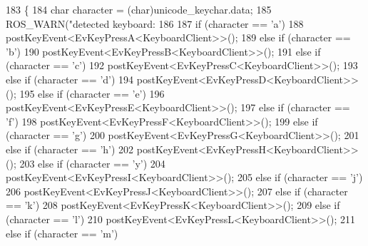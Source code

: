\begin{DoxyCode}
183         \{
184                 \textcolor{keywordtype}{char} character = (char)unicode\_keychar.data;
185                 ROS\_WARN(\textcolor{stringliteral}{"detected keyboard: %
186 
187                 \textcolor{keywordflow}{if} (character == \textcolor{charliteral}{'a'})
188                         postKeyEvent<EvKeyPressA<KeyboardClient>>();
189                 \textcolor{keywordflow}{else} \textcolor{keywordflow}{if} (character == \textcolor{charliteral}{'b'})
190                         postKeyEvent<EvKeyPressB<KeyboardClient>>();
191                 \textcolor{keywordflow}{else} \textcolor{keywordflow}{if} (character == \textcolor{charliteral}{'c'})
192                         postKeyEvent<EvKeyPressC<KeyboardClient>>();
193                 \textcolor{keywordflow}{else} \textcolor{keywordflow}{if} (character == \textcolor{charliteral}{'d'})
194                         postKeyEvent<EvKeyPressD<KeyboardClient>>();
195                 \textcolor{keywordflow}{else} \textcolor{keywordflow}{if} (character == \textcolor{charliteral}{'e'})
196                         postKeyEvent<EvKeyPressE<KeyboardClient>>();
197                 \textcolor{keywordflow}{else} \textcolor{keywordflow}{if} (character == \textcolor{charliteral}{'f'})
198                         postKeyEvent<EvKeyPressF<KeyboardClient>>();
199                 \textcolor{keywordflow}{else} \textcolor{keywordflow}{if} (character == \textcolor{charliteral}{'g'})
200                         postKeyEvent<EvKeyPressG<KeyboardClient>>();
201                 \textcolor{keywordflow}{else} \textcolor{keywordflow}{if} (character == \textcolor{charliteral}{'h'})
202                         postKeyEvent<EvKeyPressH<KeyboardClient>>();
203                 \textcolor{keywordflow}{else} \textcolor{keywordflow}{if} (character == \textcolor{charliteral}{'y'})
204                         postKeyEvent<EvKeyPressI<KeyboardClient>>();
205                 \textcolor{keywordflow}{else} \textcolor{keywordflow}{if} (character == \textcolor{charliteral}{'j'})
206                         postKeyEvent<EvKeyPressJ<KeyboardClient>>();
207                 \textcolor{keywordflow}{else} \textcolor{keywordflow}{if} (character == \textcolor{charliteral}{'k'})
208                         postKeyEvent<EvKeyPressK<KeyboardClient>>();
209                 \textcolor{keywordflow}{else} \textcolor{keywordflow}{if} (character == \textcolor{charliteral}{'l'})
210                         postKeyEvent<EvKeyPressL<KeyboardClient>>();
211                 \textcolor{keywordflow}{else} \textcolor{keywordflow}{if} (character == \textcolor{charliteral}{'m'})
}
\end{DoxyCode}

